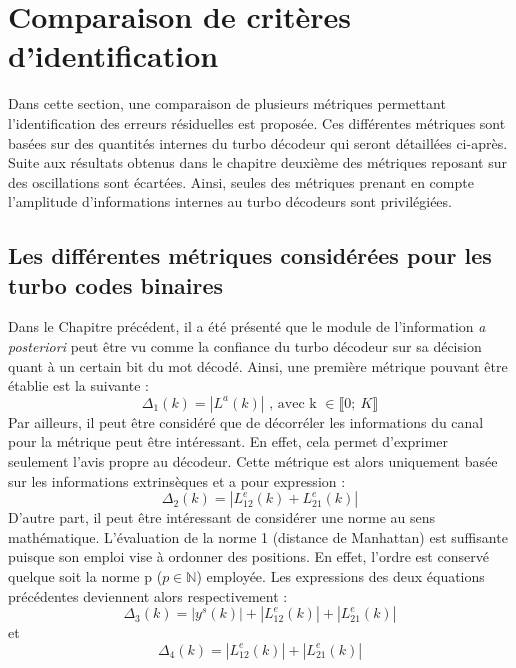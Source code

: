 \section{Comparaison de critères d'identification}
Dans cette section, une comparaison de plusieurs métriques permettant l'identification des erreurs résiduelles est 
proposée. Ces différentes métriques sont basées sur des quantités internes du turbo décodeur qui seront détaillées ci-après.\\
Suite aux résultats obtenus dans le chapitre deuxième des métriques reposant sur des oscillations sont écartées. Ainsi, 
seules des métriques prenant en compte l'amplitude d'informations internes au turbo décodeurs sont privilégiées.

\subsection{Les différentes métriques considérées pour les turbo codes binaires}
Dans le Chapitre précédent, il a été présenté que le module de l'information \textit{a posteriori} peut être vu comme 
la confiance du turbo décodeur sur sa décision quant à un certain bit du mot décodé. Ainsi, une première métrique pouvant 
être établie est la suivante :
\begin{equation}
	\Delta_1(k) = |L^a(k)|\text{~, avec k~}\in \llbracket0;~K \rrbracket 
\end{equation}
Par ailleurs, il peut être considéré que de décorréler les informations du canal pour la métrique peut être intéressant. En effet, 
cela permet d'exprimer seulement l'avis propre au décodeur. Cette métrique est alors uniquement basée sur les informations 
extrinsèques et a pour expression : 
\begin{equation}
	\Delta_2(k) = |L^e_{12}(k)+L^e_{21}(k)|
\end{equation}
D'autre part, il peut être intéressant de considérer une norme au sens mathématique. L'évaluation de la norme 1 
(distance de Manhattan) est suffisante puisque son emploi vise à ordonner des positions. En effet, l'ordre est 
conservé quelque soit la norme p ($p \in \mathbb{N} $) employée. Les expressions des deux équations précédentes deviennent 
alors respectivement :
\begin{equation}
	\Delta_3(k) = |y^s(k)| + |L^e_{12}(k)| + |L^e_{21}(k)|
\end{equation}
et 
\begin{equation}
	\Delta_4(k) = |L^e_{12}(k)| + |L^e_{21}(k)|
\end{equation}

